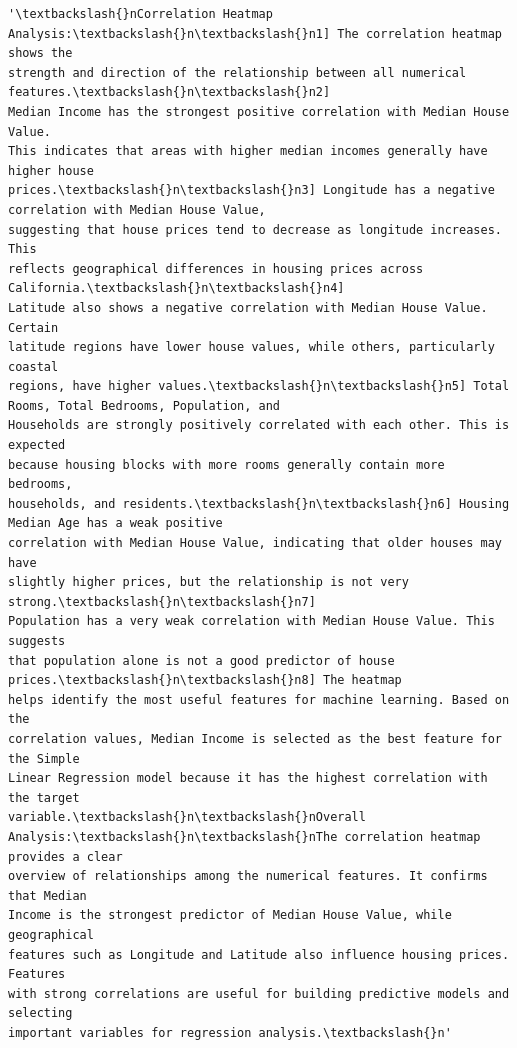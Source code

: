 \documentclass[11pt]{article}
\makeatletter
\newcommand{\boxspacing}{\kern\kvtcb@left@rule\kern\kvtcb@boxsep}
\newcommand{\prompt}[4]{
        {\ttfamily\llap{{\color{#2}[#3]:\hspace{3pt}#4}}\vspace{-\baselineskip}}
    }
\makeatother
\begin{document}
            \begin{tcolorbox}[breakable, size=fbox, boxrule=.5pt, pad at break*=1mm, opacityfill=0]
\prompt{Out}{outcolor}{69}{\boxspacing}
\begin{Verbatim}[commandchars=\\\{\}]
'\textbackslash{}nCorrelation Heatmap Analysis:\textbackslash{}n\textbackslash{}n1] The correlation heatmap shows the
strength and direction of the relationship between all numerical features.\textbackslash{}n\textbackslash{}n2]
Median Income has the strongest positive correlation with Median House Value.
This indicates that areas with higher median incomes generally have higher house
prices.\textbackslash{}n\textbackslash{}n3] Longitude has a negative correlation with Median House Value,
suggesting that house prices tend to decrease as longitude increases. This
reflects geographical differences in housing prices across California.\textbackslash{}n\textbackslash{}n4]
Latitude also shows a negative correlation with Median House Value. Certain
latitude regions have lower house values, while others, particularly coastal
regions, have higher values.\textbackslash{}n\textbackslash{}n5] Total Rooms, Total Bedrooms, Population, and
Households are strongly positively correlated with each other. This is expected
because housing blocks with more rooms generally contain more bedrooms,
households, and residents.\textbackslash{}n\textbackslash{}n6] Housing Median Age has a weak positive
correlation with Median House Value, indicating that older houses may have
slightly higher prices, but the relationship is not very strong.\textbackslash{}n\textbackslash{}n7]
Population has a very weak correlation with Median House Value. This suggests
that population alone is not a good predictor of house prices.\textbackslash{}n\textbackslash{}n8] The heatmap
helps identify the most useful features for machine learning. Based on the
correlation values, Median Income is selected as the best feature for the Simple
Linear Regression model because it has the highest correlation with the target
variable.\textbackslash{}n\textbackslash{}nOverall Analysis:\textbackslash{}n\textbackslash{}nThe correlation heatmap provides a clear
overview of relationships among the numerical features. It confirms that Median
Income is the strongest predictor of Median House Value, while geographical
features such as Longitude and Latitude also influence housing prices. Features
with strong correlations are useful for building predictive models and selecting
important variables for regression analysis.\textbackslash{}n'
\end{Verbatim}
\end{tcolorbox}
        
\end{document}
